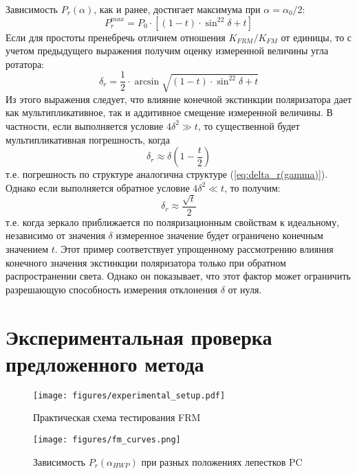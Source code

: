 \documentclass{article}
\begin{document}
Зависимость $P_r(\alpha)$, как и ранее, достигает максимума при $\alpha=\alpha_0/2$: 
\begin{equation}
    \label{eq:Pr_max(delta,t)}
    P_r^{max}=P_0\cdot\left[(1-t)\cdot \sin^22\delta+t \right]
\end{equation}
Если для простоты пренебречь отличием отношения $K_{FRM}/K_{FM}$ от единицы, то с учетом предыдущего выражения получим оценку измеренной величины угла ротатора:
\begin{equation}
    \label{eq:delta_est(delta, t)}
    \delta_r=\frac{1}{2}\cdot\arcsin\sqrt{(1-t)\cdot \sin^22\delta+t}
\end{equation}
Из этого выражения следует, что влияние конечной экстинкции поляризатора дает как мультипликативное, так и аддитивное смещение измеренной величины. В частности, если выполняется условие $4\delta^2\gg t$, то существенной будет мультипликативная погрешность, когда
\begin{equation}
    \delta_r \approx \delta\left(1-\frac{t}{2}\right)
\end{equation}
т.е. погрешность по структуре аналогична структуре (\ref{eq:delta_r(gamma)}). Однако если выполняется обратное условие $4\delta^2\ll t$, то получим:
\begin{equation}
    \delta_r \approx \frac{\sqrt{t}}{2}
\end{equation}
т.е. когда зеркало приближается по поляризационным свойствам к идеальному, независимо от значения  $\delta $ измеренное значение будет ограничено конечным значением $t$. Этот пример соответствует упрощенному рассмотрению влияния конечного значения экстинкции поляризатора только при обратном распространении света. Однако он показывает, что этот фактор может ограничить разрешающую способность измерения отклонения $\delta $ от нуля.   


\section{Экспериментальная проверка предложенного метода}
\begin{figure}[b]
	\centering
	\texttt{[image: figures/experimental\_setup.pdf]}
	\caption{Практическая схема тестирования FRM}
	\label{fig:experimantalScheme}
\end{figure}

\begin{figure}[b]
	\centering
	\texttt{[image: figures/fm\_curves.png]}
	\caption{Зависимость $P_r(\alpha_{HWP})$ при разных положениях лепестков PC}
	\label{fig:fm_curves}
\end{figure}
\end{document}
